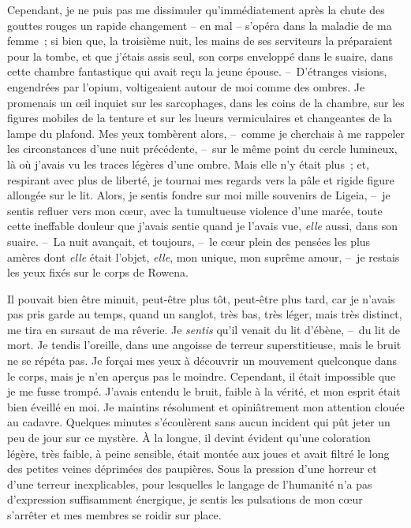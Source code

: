 \documentclass[french,twoside]{book} %
\begin{document}
Cependant, je ne puis pas me dissimuler qu’immédiatement après la chute des gouttes rouges un rapide changement – en mal – s’opéra dans la maladie de ma femme ; si bien que, la troisième nuit, les mains de ses serviteurs la préparaient pour la tombe, et que j’étais assis seul, son corps enveloppé dans le suaire, dans cette chambre fantastique qui avait reçu la jeune épouse. – D’étranges visions, engendrées par l’opium, voltigeaient autour de moi comme des ombres. Je promenais un œil inquiet sur les sarcophages, dans les coins de la chambre, sur les figures mobiles de la tenture et sur les lueurs vermiculaires et changeantes de la lampe du plafond. Mes yeux tombèrent alors, – comme je cherchais à me rappeler les circonstances d’une nuit précédente, – sur le même point du cercle lumineux, là où j’avais vu les traces légères d’une ombre. Mais elle n’y était plus ; et, respirant avec plus de liberté, je tournai mes regards vers la pâle et rigide figure allongée sur le lit. Alors, je sentis fondre sur moi mille souvenirs de Ligeia, – je sentis refluer vers mon cœur, avec la tumultueuse violence d’une marée, toute cette ineffable douleur que j’avais sentie quand je l’avais vue, \emph{elle} aussi, dans son suaire. – La nuit avançait, et toujours, – le cœur plein des pensées les plus amères dont \emph{elle} était l’objet, \emph{elle}, mon unique, mon suprême amour, – je restais les yeux fixés sur le corps de Rowena.\par
Il pouvait bien être minuit, peut-être plus tôt, peut-être plus tard, car je n’avais pas pris garde au temps, quand un sanglot, très bas, très léger, mais très distinct, me tira en sursaut de ma rêverie. Je \emph{sentis} qu’il venait du lit d’ébène, – du lit de mort. Je tendis l’oreille, dans une angoisse de terreur superstitieuse, mais le bruit ne se répéta pas. Je forçai mes yeux à découvrir un mouvement quelconque dans le corps, mais je n’en aperçus pas le moindre. Cependant, il était impossible que je me fusse trompé. J’avais entendu le bruit, faible à la vérité, et mon esprit était bien éveillé en moi. Je maintins résolument et opiniâtrement mon attention clouée au cadavre. Quelques minutes s’écoulèrent sans aucun incident qui pût jeter un peu de jour sur ce mystère. À la longue, il devint évident qu’une coloration légère, très faible, à peine sensible, était montée aux joues et avait filtré le long des petites veines déprimées des paupières. Sous la pression d’une horreur et d’une terreur inexplicables, pour lesquelles le langage de l’humanité n’a pas d’expression suffisamment énergique, je sentis les pulsations de mon cœur s’arrêter et mes membres se roidir sur place.\par
\end{document}
